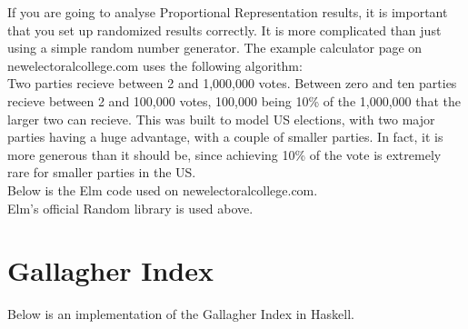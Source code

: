\documentclass{article}
\begin{document}
    If you are going to analyse Proportional Representation results, it is important that you set up randomized results correctly. It is more complicated than just using a simple random number generator. The example calculator page on newelectoralcollege.com uses the following algorithm: \\

    Two parties recieve between 2 and 1,000,000 votes. Between zero and ten parties recieve between 2 and 100,000 votes, 100,000 being 10\% of the 1,000,000 that the larger two can recieve. This was built to model US elections, with two major parties having a huge advantage, with a couple of smaller parties. In fact, it is more generous than it should be, since achieving 10\% of the vote is extremely rare for smaller parties in the US. \\

    Below is the Elm code used on newelectoralcollege.com. \\

    

    Elm's official Random library is used above.

    \section{Gallagher Index}

    Below is an implementation of the Gallagher Index in Haskell.

    
\end{document}
